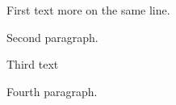 \documentclass{article}
\begin{document}
First text\vspace{1cm}\vspace{2cm} more on the same line.

Second paragraph.

Third text \medskip\bigskip

Fourth paragraph.
\end{document}
